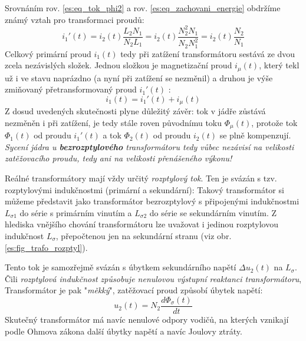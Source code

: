       Srovnáním rov. \ref{es:eq_tok_phi2} a rov. \ref{es:eq_zachovani_energie} obdržíme známý vztah
      pro transformaci proudů:
      \begin{equation}\label{es:eq_i1_cark}
        i_1'(t)=i_2(t)\frac{L_2N_1}{N_2L_1}=i_2 (t)\frac{N_2^2N_1}{N_2N_1^2}=i_2(t)\frac{N_2}{N_1}
      \end{equation}
      Celkový primární proud $i_1(t)$ tedy při zatížení transformátoru sestává ze dvou zcela nezávislých 
      složek. Jednou složkou je magnetizační proud $i_\mu(t)$, který tekl už i ve stavu naprázdno (a nyní při 
      zatížení se nezměnil) a druhou je výše zmiňovaný přetransformovaný proud $i_1'(t)$ :
      \begin{equation}\label{es:eq_i1_sum}
        i_1(t)=i_1'(t)+i_\mu(t)
      \end{equation}
      Z dosud uvedených skutečnosti plyne důležitý závěr: tok v jádře zůstává nezměněn i při zatížení, je 
      tedy stále roven původnímu toku $\Phi_\mu(t)$, protože tok $\Phi_1(t)$ od proudu $i_1'(t)$ a tok 
      $\Phi_2(t)$ od proudu $i_2(t)$ se plně kompenzují. \emph{Sycení jádra u \textbf{bezrozptylového} 
      transformátoru tedy vůbec nezávisí na velikosti zatěžovacího prou\-du, tedy ani na velikosti 
      přenášeného výkonu!}

      Reálné transformátory mají vždy určitý \emph{rozptylový tok}. Ten je svázán s tzv.      
      roz\-pty\-lo\-vý\-mi indukčnostmi (primární a sekundární): Takový transformátor si můžeme představit 
      jako transformátor bezrozptylový s připojen\-ými indukčnostmi $L_{\sigma1}$ do série s pri\-már\-ním 
      vinutím a $L_{\sigma2}$ do série se sekundár\-ním vinutím. Z hlediska vnějšího chování transformátoru 
      lze uvažovat i jedinou rozptylovou indukčnost $L_\sigma$, přepočtenou jen na sekundární stranu (viz 
      obr. \ref{es:fig_trafo_rozptyl}).

      Tento tok je samozřejmě svázán s úbytkem sekundárního napětí $\Delta u_2(t)$ na $L_\sigma$.
      Čili \emph{rozptylová indukčnost způsobuje nenulovou výstupní reaktanci transformátoru},
      Transformátor je pak "\emph{měkký}", zatěžovací proud způsobí úbytek napětí:
      \begin{equation}\label{es:eq_ubytek_Lsigma}
        u_2(t)=N_2\frac{d\Phi_\sigma(t)}{dt}
      \end{equation}
      Skutečný transformátor má navíc nenulové odpory vodičů, na kterých vznikají podle Ohmova
      zákona další úbytky napětí a navíc Joulovy ztráty.

